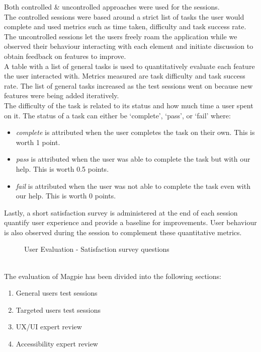 \noindent Both controlled \& uncontrolled approaches were used for the sessions.\\
The controlled sessions were based around a strict list of tasks the user would complete and used metrics such as time taken, difficulty and task success rate.\\
The uncontrolled sessions let the users freely roam the application while we observed their behaviour interacting with each element and initiate discussion to obtain feedback on features to improve.\\

\noindent A table with a list of general tasks is used to quantitatively evaluate each feature the user interacted with. Metrics measured are task difficulty and task success rate. The list of general tasks increased as the test sessions went on because new features were being added iteratively.\\
The difficulty of the task is related to its status and how much time a user spent on it. The status of a task can either be `complete', `pass', or `fail' where:
\begin{itemize}
    \item \emph{complete} is attributed when the user completes the task on their own. This is worth 1 point.
    \item \emph{pass} is attributed when the user was able to complete the task but with our help. This is worth 0.5 points.
    \item \emph{fail} is attributed when the user was not able to complete the task even with our help. This is worth 0 points.
\end{itemize}
Lastly, a short satisfaction survey is administered at the end of each session quantify user experience and provide a baseline for improvements. User behaviour is also observed during the session to complement these quantitative metrics.\\
\begin{figure}[h!]
    \centering
    \caption{User Evaluation - Satisfaction survey questions}
\end{figure}\\

\newpage{}
The evaluation of Magpie has been divided into the following sections:
\begin{enumerate}
    \item General users test sessions
    \item Targeted users test sessions
    \item UX/UI expert review
    \item Accessibility expert review
\end{enumerate}

